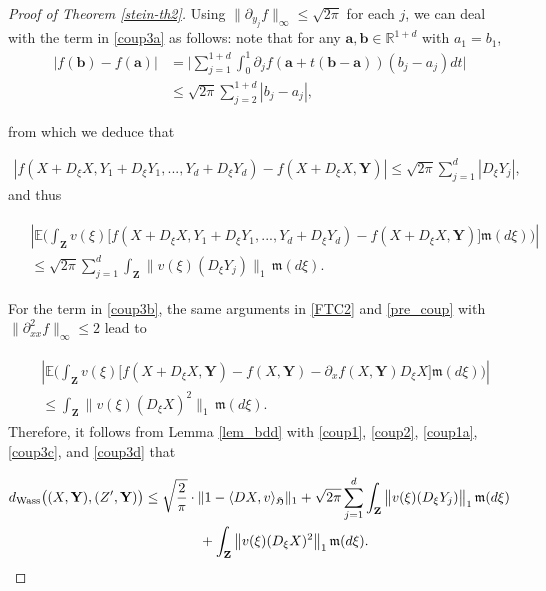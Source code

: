 \documentclass[letterpaper, 11pt,  reqno]{amsart}
\newcommand{\noi}{\noindent}
\newcommand{\R}{\mathbb{R}}
\newcommand{\E}{\mathbb{E}}
\newcommand{\fm}{\mathfrak{m}}
\newcommand{\fH}{\mathfrak{H}}
\numberwithin{equation}{section}
\numberwithin{theorem}{section}
\begin{document}
\begin{proof}[Proof of Theorem \ref{stein-th2}]
 \noi
 Using  $\| \partial_{y_j} f \|_\infty \leq  \sqrt{2\pi}$ for each $j$,
 we can deal with  the term in \eqref{coup3a} as follows:
 note that for any $\pmb{a}, \pmb{b}\in\R^{1+d}$ with $a_1=b_1$,
 \begin{align*}
| f(\pmb{b}) - f(\pmb{a}) | 
&= \bigg| \sum_{j=1}^{1+d} \int_0^1   \partial_j f( \pmb{a} + t(\pmb{b}-\pmb{a})) (b_j-a_j) dt \bigg| \\
&\leq \sqrt{2\pi} \sum_{j=2}^{1+d} |b_j-a_j|,
 \end{align*}
 
 \noi
 from which we deduce that 
 
 \noi
 \begin{align*}
|  f(X + D_\xi X, Y_1 + D_\xi Y_1, ... , Y_d + D_\xi Y_d) - f( X + D_\xi X, \mathbf{Y} ) |
\leq \sqrt{2\pi} \sum_{j=1}^d | D_\xi Y_j|,
 \end{align*}
 and thus
 
 \noi
  \begin{align}   \label{coup3c}
    \begin{aligned}  
&\left|  \E\bigg(  \int_{\mathbf{Z}} v(\xi)  \Big[  f(X + D_\xi X, Y_1 + D_\xi Y_1, ... , Y_d + D_\xi Y_d)
      - f( X + D_\xi X, \mathbf{Y} )  \Big] \fm(d\xi) \bigg) \right| \\
& \leq \sqrt{2\pi} \sum_{j=1}^d   \int_{\mathbf{Z}}  \big\| v(\xi)   ( D_\xi Y_j )  \big\|_1 \, \fm(d\xi).
 \end{aligned}
 \end{align}

\noi
For the term in \eqref{coup3b}, the same arguments in \eqref{FTC2} and 
\eqref{pre_coup} with $\|\partial^2_{xx} f\|_\infty \leq 2$
lead to 

  \noi
  \begin{align}   \label{coup3d}
    \begin{aligned}  
& \left| \E\bigg(  \int_{\mathbf{Z}} v(\xi)  \Big[     f( X + D_\xi X, \mathbf{Y} )
 -   f(X, \mathbf{Y}) -
 \partial_x f(X, \mathbf{Y})   D_\xi X   \Big] \fm(d\xi) \bigg) \right| \\
& \leq    \int_{\mathbf{Z}}  \big\| v(\xi)   ( D_\xi X )^2  \big\|_1 \, \fm(d\xi).
 \end{aligned}
 \end{align}
 Therefore, it follows from Lemma \eqref{lem_bdd}
 with  \eqref{coup1}, \eqref{coup2}, \eqref{coup1a}, \eqref{coup3c},
 and \eqref{coup3d} that 

\noi
\begin{align}
 \notag%
\begin{aligned}
d_{\rm Wass}\big(  (X, \mathbf{Y}),  ( Z', \mathbf{Y})     \big)
& \leq 
    \sqrt{\frac2\pi}  \cdot
 \| 1 -\langle DX, v \rangle_{\fH} \|_1   + 
 \sqrt{2\pi} \sum_{j=1}^d   \int_{\mathbf{Z}}  \big\| v(\xi)   ( D_\xi Y_j )  \big\|_1 \, \fm(d\xi) \\
&\qquad\qquad +  \int_{\mathbf{Z}}  \big\| v(\xi)   ( D_\xi X )^2  \big\|_1 \, \fm(d\xi).
\end{aligned}
\end{align}


\end{proof}
\end{document}
